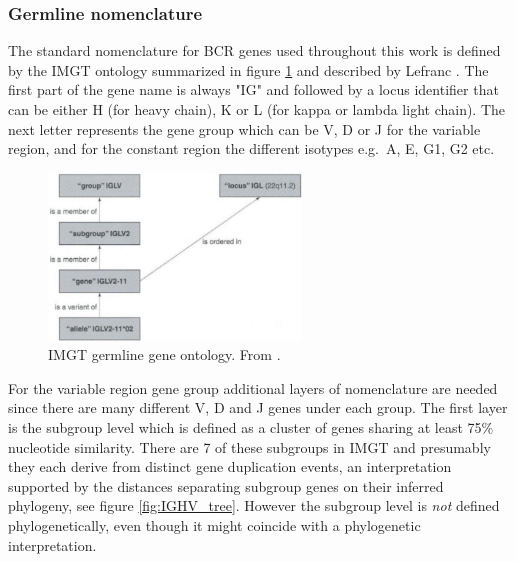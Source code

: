 \subsubsection{Germline nomenclature}
The standard nomenclature for BCR genes used throughout this work is defined by the IMGT ontology summarized in figure \ref{fig:IMGT_classification} and described by Lefranc \cite{lefranc2001nomenclature}.
The first part of the gene name is always "IG" and followed by a locus identifier that can be either H (for heavy chain), K or L (for kappa or lambda light chain).
The next letter represents the gene group which can be V, D or J for the variable region, and for the constant region the different isotypes e.g.\ A, E, G1, G2 etc.

\begin{figure}[ht]
    \centering
    \includegraphics[width=0.6\textwidth]{figures/IMGT_classification.png}
    \caption{
        \label{fig:IMGT_classification}
        IMGT germline gene ontology.
        From \cite{giudicelli1999ontology}.
    }
\end{figure}


For the variable region gene group additional layers of nomenclature are needed since there are many different V, D and J genes under each group.
The first layer is the subgroup level which is defined as a cluster of genes sharing at least 75\% nucleotide similarity.
There are 7 of these subgroups in IMGT and presumably they each derive from distinct gene duplication events, an interpretation supported by the distances separating subgroup genes on their inferred phylogeny, see figure \ref{fig:IGHV_tree}.
However the subgroup level is \textit{not} defined phylogenetically, even though it might coincide with a phylogenetic interpretation.

